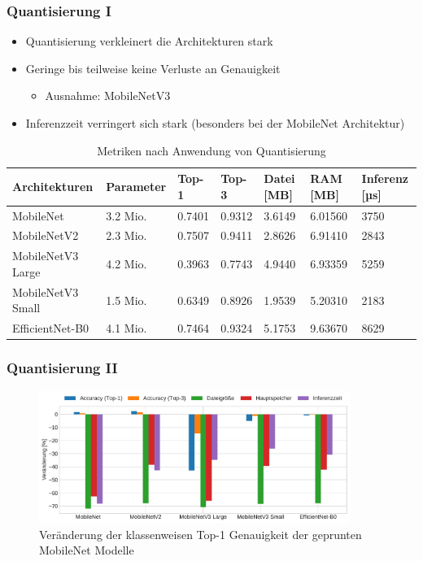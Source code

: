 \documentclass{beamer}
\begin{document}
\begin{frame}
\frametitle{Quantisierung I}

\begin{itemize}
	\item Quantisierung verkleinert die Architekturen stark
	\item Geringe bis teilweise keine Verluste an Genauigkeit
	\begin{itemize}
		\item Ausnahme: MobileNetV3
	\end{itemize}	
	\item Inferenzzeit verringert sich stark (besonders bei der MobileNet Architektur)
\end{itemize}

\begin{table}
\tiny
\centering
\begin{tabular}{lllllll}
\hline
    Architekturen & Parameter &  Top-1 &  Top-3 &  Datei [MB] &  RAM [MB] &  Inferenz [µs] \\
\hline
        MobileNet &  3.2 Mio. & 0.7401 & 0.9312 &      3.6149 &   6.01560 &           3750 \\
      MobileNetV2 &  2.3 Mio. & 0.7507 & 0.9411 &      2.8626 &   6.91410 &           2843 \\
MobileNetV3 Large &  4.2 Mio. & 0.3963 & 0.7743 &      4.9440 &   6.93359 &           5259 \\
MobileNetV3 Small &  1.5 Mio. & 0.6349 & 0.8926 &      1.9539 &   5.20310 &           2183 \\
  EfficientNet-B0 &  4.1 Mio. & 0.7464 & 0.9324 &      5.1753 &   9.63670 &           8629 \\
\hline
\end{tabular}
\caption{Metriken nach Anwendung von Quantisierung}
\end{table}

\end{frame}


\begin{frame}
\frametitle{Quantisierung II}

\begin{figure}
\includegraphics[width=0.9\textwidth]{img/quantization_improvements.pdf}
\caption{Veränderung der klassenweisen Top-1 Genauigkeit der geprunten MobileNet Modelle}
\end{figure}

\end{frame}
\end{document}
